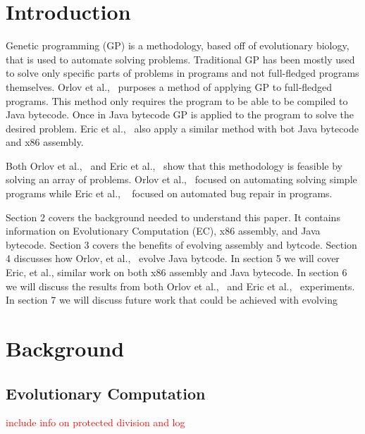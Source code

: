 \documentclass{sig-alternate}
\newcommand{\mycomment}[1]{\textcolor{red}{#1}}
\begin{document}

\section{Introduction}
Genetic programming (GP) is a methodology, based off of evolutionary biology, that is used to automate solving problems. Traditional GP has been mostly used to solve only specific parts of problems in programs and not full-fledged programs themselves. Orlov et al.,~\cite{FINCH2:2009} purposes a method of applying GP to full-fledged programs. This method only requires the program to be able to be compiled to Java bytecode. Once in Java bytecode GP is applied to the program to solve the desired problem. Eric et al.,~\cite{Assembly:2010} also apply a similar method with bot Java bytecode and x86 assembly.\par
	Both Orlov et al.,~\cite{FINCH:2011} and Eric et al.,~\cite{Assembly:2010} show that this methodology is feasible by solving an array of problems. Orlov et al.,~\cite{FINCH2:2011} focused on automating solving simple programs while Eric et al., ~\cite{Assembly:2010} focused on automated bug repair in programs. 
	
Section 2 covers the background needed to understand this paper. It contains information on Evolutionary Computation (EC), x86 assembly, and Java bytecode. Section 3 covers the benefits of evolving assembly and bytcode. Section 4 discusses how Orlov, et al.,~\cite{FINCH:2011} evolve Java bytcode. In section 5 we will cover Eric, et al., similar work on both x86 assembly and Java bytecode. In section 6 we will discuss the results from both Orlov et al.,~\cite{FINCH:2011} and Eric et al.,~\cite{Assembly:2010} experiments. In section 7 we will discuss future work that could be achieved with evolving 
	
	

\section{Background}

\subsection{Evolutionary Computation}

\mycomment{include info on protected division and log}
\end{document}
